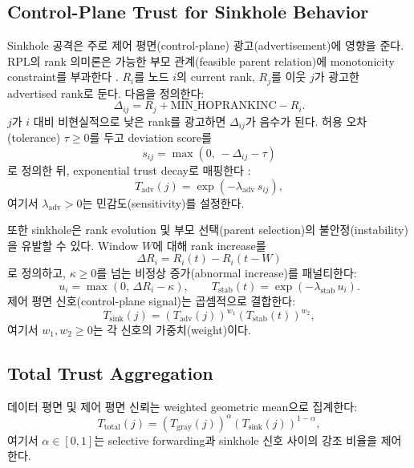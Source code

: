 \documentclass[11pt,a4paper]{article}
\begin{document}
\subsection{Control-Plane Trust for Sinkhole Behavior}
\label{subsec:sinkhole}
Sinkhole 공격은 주로 제어 평면(control-plane) 광고(advertisement)에 영향을 준다. RPL의 rank 의미론은 가능한 부모 관계(feasible parent relation)에 monotonicity constraint를 부과한다 \citep{rfc6550}. $R_i$를 노드 $i$의 current rank, $R_j$를 이웃 $j$가 광고한 advertised rank로 둔다. 다음을 정의한다:
\begin{equation}
\Delta_{ij}=R_j+\mathrm{MIN\_HOPRANKINC}-R_i.
\end{equation}
$j$가 $i$ 대비 비현실적으로 낮은 rank를 광고하면 $\Delta_{ij}$가 음수가 된다. 허용 오차(tolerance) $\tau\ge 0$를 두고 deviation score를
\begin{equation}
s_{ij}=\max(0,\,-\Delta_{ij}-\tau)
\end{equation}
로 정의한 뒤, exponential trust decay로 매핑한다 \citep{sun2005trust,chen2010trust}:
\begin{equation}
T_{\text{adv}}(j)=\exp(-\lambda_{\text{adv}}\,s_{ij}),
\end{equation}
여기서 $\lambda_{\text{adv}}>0$는 민감도(sensitivity)를 설정한다.

또한 sinkhole은 rank evolution 및 부모 선택(parent selection)의 불안정(instability)을 유발할 수 있다. Window $W$에 대해 rank increase를
\begin{equation}
\Delta R_i=R_i(t)-R_i(t-W)
\end{equation}
로 정의하고, $\kappa\ge 0$를 넘는 비정상 증가(abnormal increase)를 패널티한다:
\begin{equation}
u_i=\max(0,\,\Delta R_i-\kappa), \qquad
T_{\text{stab}}(t)=\exp(-\lambda_{\text{stab}}\,u_i).
\end{equation}
제어 평면 신호(control-plane signal)는 곱셈적으로 결합한다:
\begin{equation}
T_{\text{sink}}(j)=\left(T_{\text{adv}}(j)\right)^{w_1}\left(T_{\text{stab}}(t)\right)^{w_2},
\end{equation}
여기서 $w_1,w_2\ge 0$는 각 신호의 가중치(weight)이다.

\subsection{Total Trust Aggregation}
\label{subsec:totaltrust}
데이터 평면 및 제어 평면 신뢰는 weighted geometric mean으로 집계한다:
\begin{equation}
T_{\text{total}}(j)=\left(T_{\text{gray}}(j)\right)^{\alpha}\left(T_{\text{sink}}(j)\right)^{1-\alpha},
\end{equation}
여기서 $\alpha\in[0,1]$는 selective forwarding과 sinkhole 신호 사이의 강조 비율을 제어한다.
\end{document}
